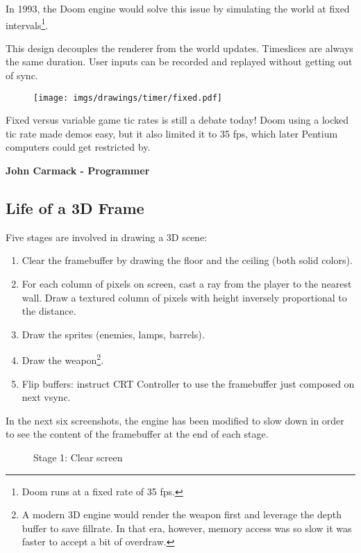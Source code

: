 \par
In 1993, the Doom engine would solve this issue by simulating the world at fixed intervals\footnote{Doom runs at a fixed rate of 35 fps.}.\\
\par
\begin{minipage}{\textwidth}
 
 \end{minipage}
\par
This design decouples the renderer from the world updates. Timeslices are always the same duration. User inputs can be recorded and replayed without getting out of sync.
\par
 \begin{figure}[H]
\centering
 \texttt{[image: imgs/drawings/timer/fixed.pdf]}
 \end{figure}

\begin{fancyquotes}
 Fixed versus variable game tic rates is still a debate today!  Doom using a locked tic rate made demos easy, but it also limited it to 35 fps, which later Pentium computers could get restricted by.\\
\par
\textbf{John Carmack - Programmer}
 \end{fancyquotes}










\subsection{Life of a 3D Frame}
Five stages are involved in drawing a 3D scene:\\
\begin{enumerate}
 \item Clear the framebuffer by drawing the floor and the ceiling (both solid colors).
 \item For each column of pixels on screen, cast a ray from the player to the nearest wall. Draw a textured column of pixels with height inversely proportional to the distance.
 \item Draw the sprites (enemies, lamps, barrels).
 \item Draw the weapon\footnote{A modern 3D engine would render the weapon first and leverage the depth buffer to save fillrate. In that era, however, memory access was so slow it was faster to accept a bit of overdraw.}.	
 \item Flip buffers: instruct CRT Controller to use the framebuffer just composed on next vsync.
\end{enumerate}
In the next six screenshots, the engine has been modified to slow down in order to see the content of the framebuffer at the end of each stage.\\
\begin{figure}[H]
\centering
 \caption{Stage 1: Clear screen}
 \end{figure}




